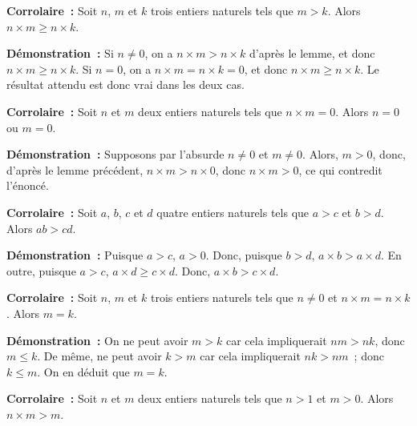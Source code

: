 \noindent\textbf{Corrolaire :} Soit $n$, $m$ et $k$ trois entiers naturels tels que $m > k$. 
                               Alors $n \times m \geq n \times k$.

\medskip

\noindent\textbf{Démonstration :} Si $n \neq 0$, on a $n \times m > n \times k$ d'après le lemme, et donc $n \times m \geq n \times k$.
    Si $n = 0$, on a $n \times m = n \times k= 0$, et donc $n \times m \geq n \times k$. 
    Le résultat attendu est donc vrai dans les deux cas.

   \done 

\medskip

\noindent\textbf{Corrolaire :} Soit $n$ et $m$ deux entiers naturels tels que $n \times m = 0$. Alors $n = 0$ ou $m = 0$. 

\medskip

\noindent\textbf{Démonstration :} Supposons par l'absurde $n \neq 0$ et $m \neq 0$.
    Alors, $m > 0$, donc, d'après le lemme précédent, $n \times m > n \times 0$, donc $n \times m > 0$, ce qui contredit l'énoncé.

   \done 

\medskip

\noindent\textbf{Corrolaire :} Soit $a$, $b$, $c$ et $d$ quatre entiers naturels tels que $a > c$ et $b > d$. 
    Alors $a b > c d$.

\medskip

\noindent\textbf{Démonstration :} Puisque $a > c$, $a > 0$.
    Donc, puisque $b > d$, $a \times b > a \times d$. 
    En outre, puisque $a > c$, $a \times d \geq c \times d$.
    Donc, $a \times b > c \times d$.

   \done 

\medskip

\noindent\textbf{Corrolaire :} Soit $n$, $m$ et $k$ trois entiers naturels tels que $n \neq 0$ et $n \times m = n \times k$. 
    Alors $m = k$.

\medskip

\noindent\textbf{Démonstration :} On ne peut avoir $m > k$ car cela impliquerait $n m > n k$, donc $m \leq k$.
   De même, ne peut avoir $k > m$ car cela impliquerait $n k > n m$ ; donc $k \leq m$. 
   On en déduit que $m = k$.

  \done 

\medskip

\noindent\textbf{Corrolaire :} Soit $n$ et $m$ deux entiers naturels tels que $n > 1$ et $m > 0$. 
    Alors $n \times m > m$.

